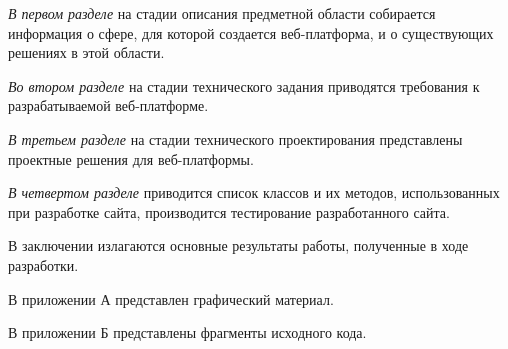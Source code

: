 \emph{В первом разделе} на стадии описания предметной области собирается информация о сфере, для которой создается веб-платформа, и о существующих решениях в этой области.

\emph{Во втором разделе} на стадии технического задания приводятся требования к разрабатываемой веб-платформе.

\emph{В третьем разделе} на стадии технического проектирования представлены проектные решения для веб-платформы.

\emph{В четвертом разделе} приводится список классов и их методов, использованных при разработке сайта, производится тестирование разработанного сайта.

В заключении излагаются основные результаты работы, полученные в ходе разработки.

В приложении А представлен графический материал.

В приложении Б представлены фрагменты исходного кода. 
